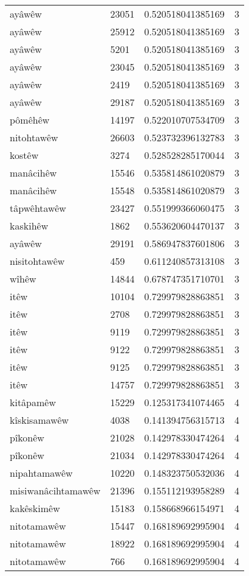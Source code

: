 \begin{longtable}{llll}
ayâwêw & 23051 & 0.520518041385169 & 3\\
ayâwêw & 25912 & 0.520518041385169 & 3\\
ayâwêw & 5201 & 0.520518041385169 & 3\\
ayâwêw & 23045 & 0.520518041385169 & 3\\
ayâwêw & 2419 & 0.520518041385169 & 3\\
ayâwêw & 29187 & 0.520518041385169 & 3\\
pômêhêw & 14197 & 0.522010707534709 & 3\\
nitohtawêw & 26603 & 0.523732396132783 & 3\\
kostêw & 3274 & 0.528528285170044 & 3\\
manâcihêw & 15546 & 0.535814861020879 & 3\\
manâcihêw & 15548 & 0.535814861020879 & 3\\
tâpwêhtawêw & 23427 & 0.551999366060475 & 3\\
kaskihêw & 1862 & 0.553620604470137 & 3\\
ayâwêw & 29191 & 0.586947837601806 & 3\\
nisitohtawêw & 459 & 0.611240857313108 & 3\\
wîhêw & 14844 & 0.678747351710701 & 3\\
itêw & 10104 & 0.729979828863851 & 3\\
itêw & 2708 & 0.729979828863851 & 3\\
itêw & 9119 & 0.729979828863851 & 3\\
itêw & 9122 & 0.729979828863851 & 3\\
itêw & 9125 & 0.729979828863851 & 3\\
itêw & 14757 & 0.729979828863851 & 3\\
kitâpamêw & 15229 & 0.125317341074465 & 4\\
kîskisamawêw & 4038 & 0.141394756315713 & 4\\
pîkonêw & 21028 & 0.142978330474264 & 4\\
pîkonêw & 21034 & 0.142978330474264 & 4\\
nipahtamawêw & 10220 & 0.148323750532036 & 4\\
misiwanâcihtamawêw & 21396 & 0.155112193958289 & 4\\
kakêskimêw & 15183 & 0.158668966154971 & 4\\
nitotamawêw & 15447 & 0.168189692995904 & 4\\
nitotamawêw & 18922 & 0.168189692995904 & 4\\
nitotamawêw & 766 & 0.168189692995904 & 4\\

\end{longtable}
